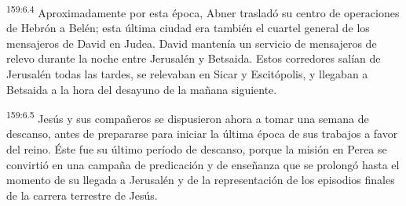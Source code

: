 \par 
\textsuperscript{159:6.4} Aproximadamente por esta época, Abner trasladó su centro de operaciones de Hebrón a Belén; esta última ciudad era también el cuartel general de los mensajeros de David en Judea. David mantenía un servicio de mensajeros de relevo durante la noche entre Jerusalén y Betsaida. Estos corredores salían de Jerusalén todas las tardes, se relevaban en Sicar y Escitópolis, y llegaban a Betsaida a la hora del desayuno de la mañana siguiente.

\par 
\textsuperscript{159:6.5} Jesús y sus compañeros se dispusieron ahora a tomar una semana de descanso, antes de prepararse para iniciar la última época de sus trabajos a favor del reino. Éste fue su último período de descanso, porque la misión en Perea se convirtió en una campaña de predicación y de enseñanza que se prolongó hasta el momento de su llegada a Jerusalén y de la representación de los episodios finales de la carrera terrestre de Jesús.